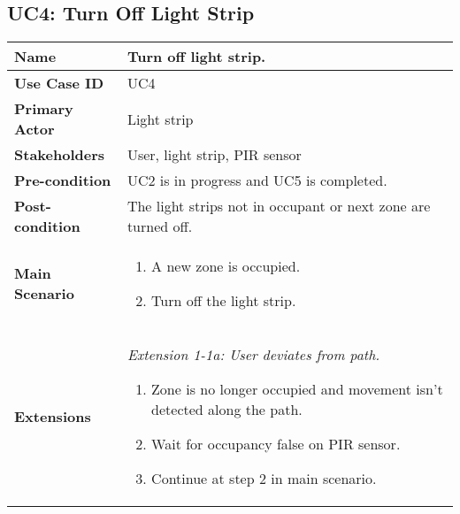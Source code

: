     \subsection{UC4: Turn Off Light Strip}
    \begin{tabular}{|p{}||p{}|}
        \hline
        \textbf{Name} &  Turn off light strip.\\
        \hline
        \textbf{Use Case ID} & UC4\\
        \hline
        \textbf{Primary Actor} & Light strip\\
        \hline
        \textbf{Stakeholders} & User, light strip, PIR sensor\\
        \hline
        \textbf{Pre-condition} &  UC2 is in progress and UC5 is completed. \\
        
        
        \hline
        \textbf{Post-condition} & The light strips not in occupant or next zone are turned off.\\
        \hline
        \textbf{Main Scenario} & 
            \begin{enumerate}
                \item A new zone is occupied.
                \item Turn off the light strip.
            \end{enumerate}
        \\
        \hline
        \textbf{Extensions} &
        \textit{Extension 1-1a: User deviates from path.}
        
        \begin{enumerate}
            \setcounter{enumi}{0}
            \item Zone is no longer occupied and movement isn't detected along the path.
            \item Wait for occupancy false on PIR sensor.
            \item Continue at step 2 in main scenario.
        \end{enumerate}
        \\
        \hline
    \end{tabular}

